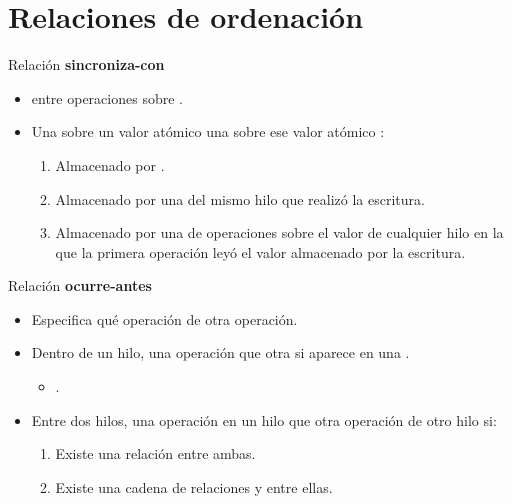 \section{Relaciones de ordenación}


\begin{frame}[t]{Relación \textbf{sincroniza-con}}
\begin{itemize}
  \item {} entre operaciones sobre .
  \vfill
  \item Una  sobre un valor atómico 
        una  sobre ese valor atómico :
    \begin{enumerate}[i]
      \item Almacenado por .
      \item Almacenado por una  del mismo hilo que realizó la escritura.
      \item Almacenado por una  de operaciones 
            sobre el valor de cualquier hilo en la que la primera operación 
            leyó el valor almacenado por la escritura.
    \end{enumerate}
\end{itemize}
\end{frame}


\begin{frame}[t]{Relación \textbf{ocurre-antes}}
\begin{itemize}
  \item Especifica qué operación  de otra operación.

  \item Dentro de un hilo, una operación  que otra si aparece en una 
        .
    \begin{itemize}
      \item {}.
    \end{itemize}

  \item Entre dos hilos, una operación en un hilo  que otra operación de otro hilo si:
    \begin{enumerate}[i]
      \item Existe una relación  entre ambas.
      \item Existe una cadena de relaciones  y  entre ellas.
    \end{enumerate}
\end{itemize}
\end{frame}

